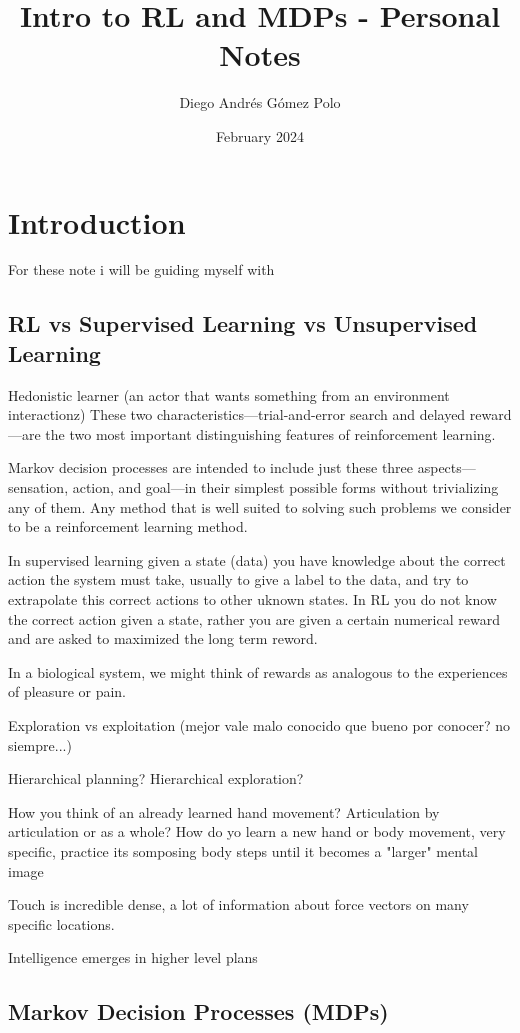 \documentclass{article}
\title{Intro to RL and MDPs - Personal Notes}
\author{Diego Andrés Gómez Polo}
\date{February 2024}
\begin{document}
\maketitle
\tableofcontents
\section{Introduction}

For these note i will be guiding myself with \cite{montague1999reinforcement}

\subsection{RL vs Supervised Learning vs Unsupervised Learning}
Hedonistic learner (an actor that wants something from an environment interactionz)
These two characteristics—trial-and-error search and delayed reward—are the two most important
distinguishing features of reinforcement learning.

Markov decision processes are intended to include just these three aspects—sensation, action, and goal—in their simplest possible forms without
trivializing any of them. Any method that is well suited to solving such problems we
consider to be a reinforcement learning method.

In supervised learning given a state (data) you have knowledge about the correct action the system must
take, usually to give a label to the data, and try to extrapolate this correct actions to other uknown states. 
In RL you do not know the correct action given a state, rather you are given a certain numerical reward and are asked to maximized the long term reword. 

In a biological system, we might think of rewards as analogous to the experiences
of pleasure or pain.


Exploration vs exploitation (mejor vale malo conocido que bueno por conocer? no siempre...)

Hierarchical planning? 
Hierarchical exploration?

How you think of an already learned hand movement? Articulation by articulation or as a whole?
How do yo learn a new hand or body movement, very specific, practice its somposing body steps until it becomes a "larger" mental image

Touch is incredible dense,  a lot of information about force vectors on many specific locations.

Intelligence emerges in higher level plans
\subsection{Markov Decision Processes (MDPs)}


\newpage


\end{document}

